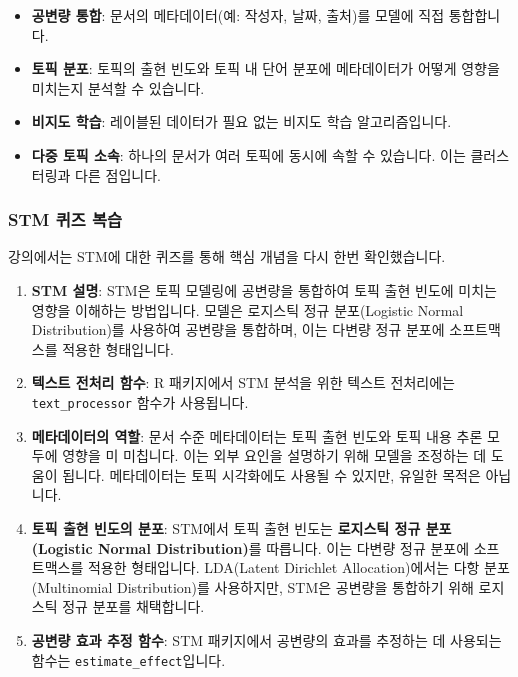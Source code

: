 \documentclass[11pt,a4paper]{article}
\theoremstyle{definition}
\begin{document}
\begin{summarybox}[title={STM의 주요 특징}]
\begin{itemize}
    \item \textbf{공변량 통합}: 문서의 메타데이터(예: 작성자, 날짜, 출처)를 모델에 직접 통합합니다.
    \item \textbf{토픽 분포}: 토픽의 출현 빈도와 토픽 내 단어 분포에 메타데이터가 어떻게 영향을 미치는지 분석할 수 있습니다.
    \item \textbf{비지도 학습}: 레이블된 데이터가 필요 없는 비지도 학습 알고리즘입니다.
    \item \textbf{다중 토픽 소속}: 하나의 문서가 여러 토픽에 동시에 속할 수 있습니다. 이는 클러스터링과 다른 점입니다.
\end{itemize}
\end{summarybox}

\subsubsection{STM 퀴즈 복습}

강의에서는 STM에 대한 퀴즈를 통해 핵심 개념을 다시 한번 확인했습니다.

\begin{enumerate}
    \item \textbf{STM 설명}: STM은 토픽 모델링에 공변량을 통합하여 토픽 출현 빈도에 미치는 영향을 이해하는 방법입니다. 모델은 로지스틱 정규 분포(Logistic Normal Distribution)를 사용하여 공변량을 통합하며, 이는 다변량 정규 분포에 소프트맥스를 적용한 형태입니다.
    \item \textbf{텍스트 전처리 함수}: R 패키지에서 STM 분석을 위한 텍스트 전처리에는 \texttt{text\_processor} 함수가 사용됩니다.
    \item \textbf{메타데이터의 역할}: 문서 수준 메타데이터는 토픽 출현 빈도와 토픽 내용 추론 모두에 영향을 미 미칩니다. 이는 외부 요인을 설명하기 위해 모델을 조정하는 데 도움이 됩니다. 메타데이터는 토픽 시각화에도 사용될 수 있지만, 유일한 목적은 아닙니다.
    \item \textbf{토픽 출현 빈도의 분포}: STM에서 토픽 출현 빈도는 \textbf{로지스틱 정규 분포(Logistic Normal Distribution)}를 따릅니다. 이는 다변량 정규 분포에 소프트맥스를 적용한 형태입니다. LDA(Latent Dirichlet Allocation)에서는 다항 분포(Multinomial Distribution)를 사용하지만, STM은 공변량을 통합하기 위해 로지스틱 정규 분포를 채택합니다.
    \item \textbf{공변량 효과 추정 함수}: STM 패키지에서 공변량의 효과를 추정하는 데 사용되는 함수는 \texttt{estimate\_effect}입니다.
\end{enumerate}
\end{document}
